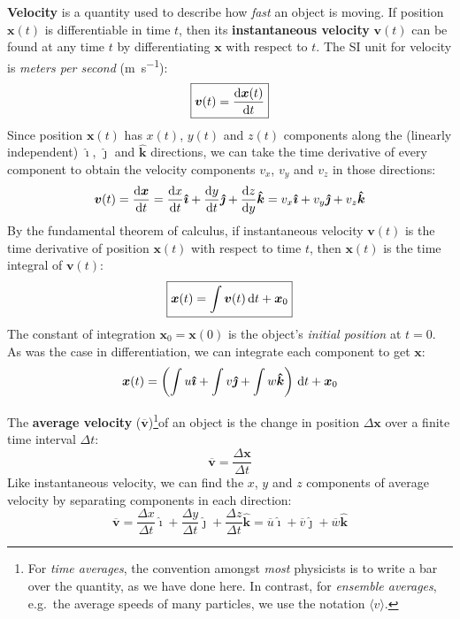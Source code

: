 \documentclass{../../oss-handout}
\begin{document}
\textbf{Velocity} is a quantity used to describe how \emph{fast} an object is
moving. If position $\bm x(t)$ is differentiable in time $t$, then its
\textbf{instantaneous velocity} $\bm v(t)$ can be found at any time $t$ by
differentiating $\bm x$ with respect to $t$. The SI unit for velocity is
\emph{meters per second} (\si{\metre\per\second}):
\begin{equation}
  \boxed{\bm v(t)= \diff{\bm x(t)}t}
\end{equation}
Since position $\bm x(t)$ has $x(t)$, $y(t)$ and $z(t)$ components along the
(linearly independent) $\bm{\hat\imath}$, $\bm{\hat\jmath}$ and $\bm{\hat k}$
directions, we can take the time derivative of every component to obtain the
velocity components $v_x$, $v_y$ and $v_z$ in those directions:
\begin{equation*}
  \bm v(t)= \diff{\bm x}t=
  \diff xt\bm{\hat\imath} + \diff yt\bm{\hat\jmath} + \diff zy\bm{\hat k}=
  v_x\bm{\hat\imath} + v_y\bm{\hat\jmath} + v_z\bm{\hat k}
\end{equation*}
By the fundamental theorem of calculus, if instantaneous velocity $\bm v(t)$
is the time derivative of position $\bm x(t)$ with respect to time $t$, then
$\bm x(t)$ is the time integral of $\bm v(t)$:
\begin{equation}
  \boxed{\bm x(t)=\int\bm v(t)\dl t + \bm x_0}
\end{equation}
The constant of integration $\bm x_0=\bm x(0)$ is the object's \emph{initial
  position} at $t=0$. As was the case in differentiation, we can integrate each
component to get $\bm x$:
\begin{equation*}
  \bm x(t)= \left(
  \int u\bm{\hat{\imath}} + \int v\bm{\hat{\jmath}} + \int w\bm{\hat{k}}
  \right)\dl t + \bm x_0
\end{equation*}


The \textbf{average velocity} ($\overline{\bm v}$)\footnote{For
  \emph{time averages}, the convention amongst \emph{most} physicists is to
  write a bar over the quantity, as we have done here. In contrast, for
  \emph{ensemble averages}, e.g.\ the average speeds of many particles, we use
  the notation $\langle v\rangle$. %
}of an object is the change in position $\Delta\bm x$ over a finite time
interval $\Delta t$:
\begin{equation}
  \boxed{\overline{\bm v}= \frac{\Delta\bm x}{\Delta t}}
\end{equation}
Like instantaneous velocity, we can find the $x$, $y$ and $z$ components of
average velocity by separating components in each direction:
\begin{equation*}
  \overline{\bm v}=
  \frac{\Delta x}{\Delta t}\bm{\hat\imath} +
  \frac{\Delta y}{\Delta t}\bm{\hat\jmath} +
  \frac{\Delta z}{\Delta t}\bm{\hat k} =
  \overline u\bm{\hat\imath} +
  \overline v\bm{\hat\jmath} +
  \overline w\bm{\hat k}
\end{equation*}
\end{document}
